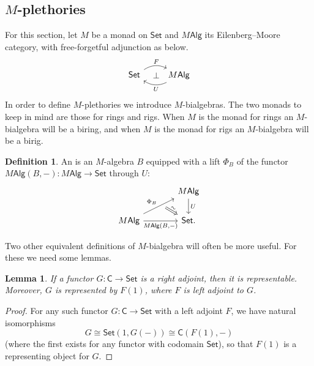 \documentclass[12pt,reqno]{amsart}
\theoremstyle{plain}
\newtheorem{lem}[thm]{Lemma}
\theoremstyle{definition}
\newtheorem{defn}[thm]{Definition}
\theoremstyle{remark}
\newcommand{\define}[1]{{\bf \boldmath{#1}}\index{#1}}
\newcommand{\maps}{\colon}
\newcommand{\category}[1]{\mathsf{#1}}
\newcommand{\C}{\category C}
\newcommand{\namedcat}[1]{\mathsf{#1}}
\newcommand{\Alg}{\namedcat{Alg}}
\newcommand{\Set}{\namedcat{Set}}
\numberwithin{thm}{section}
\begin{document}
\subsection{$M$-plethories}
\label{sec:M-plethories}

For this section, let $M$ be a monad on $\Set$ and $M\Alg$ its Eilenberg--Moore category, with free-forgetful adjunction as below.
\[
\begin{tikzcd}
    \Set
    \arrow[r, bend left, "F", pos = 0.55]
    \arrow[r, phantom, "\bot", pos = 0.6]
    &
    M\Alg
    \arrow[l, bend left, "U", pos = 0.45]
\end{tikzcd}\]
In order to define $M$-plethories we introduce $M$-bialgebras. The two monads to keep in mind are those for rings and rigs. When $M$ is the monad for rings an $M$-bialgebra will be a biring, and when $M$ is the monad for rigs an $M$-bialgebra will be a birig.

\begin{defn}
    An \define{$M$-bialgebra} is an $M$-algebra $B$ equipped with a lift $\Phi_B$ of the functor $M\Alg(B,-) \maps M\Alg \to \Set$ through $U$:
    \[
    \begin{tikzcd}[column sep = large]
        &
        M\Alg
        \arrow[d, "U"]
        \\
        M\Alg
        \arrow[ur, "\Phi_B"]
        \arrow[ur, swap, ""{name = phi}, phantom, bend right = 5, pos = 0.6]
        \arrow[r, swap, "{M\Alg(B, -)}"]
        \arrow[from = phi, r, Rightarrow, "\sim", sloped]
        &
        \Set.
    \end{tikzcd}
    \] 
\end{defn}

Two other equivalent definitions of $M$-bialgebra will often be more useful. For these we need some lemmas. 

\begin{lem}
\label{lem:rightrepable}
    If a functor $G \maps \C \to \Set$ is a right adjoint, then it is representable. Moreover, $G$ is represented by $F(1)$, where $F$ is left adjoint to $G$.
\end{lem}

\begin{proof}
    For any such functor $G \maps \C \to \Set$ with a left adjoint $F$, we have natural isomorphisms 
    \[
        G \cong \Set(1, G(-)) \cong \C(F(1), -)
    \]
    (where the first exists for any functor with codomain $\Set$), so that $F(1)$ is a representing object for $G$. 
\end{proof}
\end{document}
